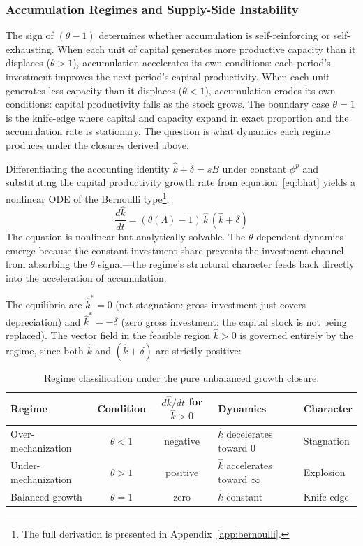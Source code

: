 \documentclass[11pt,a4paper]{article}
\begin{document}

\subsubsection{Accumulation Regimes and Supply-Side Instability}
\label{sec:regimes}

The sign of $(\theta - 1)$ determines whether accumulation is self-reinforcing or self-exhausting. When each unit of capital generates more productive capacity than it displaces ($\theta > 1$), accumulation accelerates its own conditions: each period's investment improves the next period's capital productivity. When each unit generates less capacity than it displaces ($\theta < 1$), accumulation erodes its own conditions: capital productivity falls as the stock grows. The boundary case $\theta = 1$ is the knife-edge where capital and capacity expand in exact proportion and the accumulation rate is stationary. The question is what dynamics each regime produces under the closures derived above.

Differentiating the accounting identity $\hat{k} + \delta = sB$ under constant $\phi^p$ and substituting the capital productivity growth rate from equation~\eqref{eq:bhat} yields a nonlinear ODE of the Bernoulli type\footnote{The full derivation is presented in Appendix~\ref{app:bernoulli}.}:
%
\begin{equation}\label{eq:bernoulli}
	\boxed{\frac{d\hat{k}}{dt} = (\theta(\Lambda) - 1)\,\hat{k}\,(\hat{k} + \delta)}
\end{equation}
%
The equation is nonlinear but analytically solvable. The $\theta$-dependent dynamics emerge because the constant investment share prevents the investment channel from absorbing the $\theta$ signal---the regime's structural character feeds back directly into the acceleration of accumulation.

The equilibria are $\hat{k}^* = 0$ (net stagnation: gross investment just covers depreciation) and $\hat{k}^* = -\delta$ (zero gross investment: the capital stock is not being replaced). The vector field in the feasible region $\hat{k} > 0$ is governed entirely by the regime, since both $\hat{k}$ and $(\hat{k} + \delta)$ are strictly positive:

\begin{table}[H]
	\centering
	\begin{tabular}{lccll}
		\toprule
		\textbf{Regime} & \textbf{Condition} & $d\hat{k}/dt$ for $\hat{k} > 0$ & \textbf{Dynamics} & \textbf{Character} \\
		\midrule
		Over-mechanization & $\theta < 1$ & negative & $\hat{k}$ decelerates toward 0 & Stagnation \\
		Under-mechanization & $\theta > 1$ & positive & $\hat{k}$ accelerates toward $\infty$ & Explosion \\
		Balanced growth & $\theta = 1$ & zero & $\hat{k}$ constant & Knife-edge \\
		\bottomrule
	\end{tabular}
	\caption{Regime classification under the pure unbalanced growth closure.}
	\label{tab:regime_classification}
\end{table}
\end{document}
